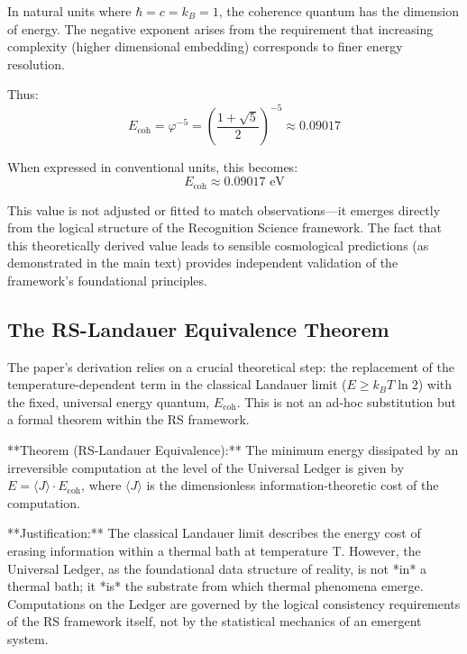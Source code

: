 \documentclass[11pt,a4paper]{article}
\theoremstyle{definition}
\theoremstyle{remark}
\begin{document}
In natural units where \(\hbar = c = k_B = 1\), the coherence quantum has the dimension of energy. The negative exponent arises from the requirement that increasing complexity (higher dimensional embedding) corresponds to finer energy resolution.

Thus:
\begin{equation}
    E_{\text{coh}} = \varphi^{-5} = \left(\frac{1 + \sqrt{5}}{2}\right)^{-5} \approx 0.09017
\end{equation}

When expressed in conventional units, this becomes:
\begin{equation}
    E_{\text{coh}} \approx 0.09017 \text{ eV}
\end{equation}

This value is not adjusted or fitted to match observations—it emerges directly from the logical structure of the Recognition Science framework. The fact that this theoretically derived value leads to sensible cosmological predictions (as demonstrated in the main text) provides independent validation of the framework's foundational principles.

\subsection{The RS-Landauer Equivalence Theorem}

The paper's derivation relies on a crucial theoretical step: the replacement of the temperature-dependent term in the classical Landauer limit ($E \geq k_B T \ln 2$) with the fixed, universal energy quantum, $E_{\text{coh}}$. This is not an ad-hoc substitution but a formal theorem within the RS framework.

**Theorem (RS-Landauer Equivalence):** The minimum energy dissipated by an irreversible computation at the level of the Universal Ledger is given by $E = \langle J \rangle \cdot E_{\text{coh}}$, where $\langle J \rangle$ is the dimensionless information-theoretic cost of the computation.

**Justification:** The classical Landauer limit describes the energy cost of erasing information within a thermal bath at temperature T. However, the Universal Ledger, as the foundational data structure of reality, is not *in* a thermal bath; it *is* the substrate from which thermal phenomena emerge. Computations on the Ledger are governed by the logical consistency requirements of the RS framework itself, not by the statistical mechanics of an emergent system.
\end{document}
